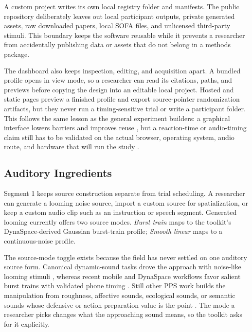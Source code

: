 \documentclass[pdflatex,sn-apa]{sn-jnl}
\begin{document}
A custom project writes its own local registry folder and manifests. The public repository deliberately leaves out local participant outputs, private generated assets, raw downloaded papers, local SOFA files, and unlicensed third-party stimuli. This boundary keeps the software reusable while it prevents a researcher from accidentally publishing data or assets that do not belong in a methods package.

The dashboard also keeps inspection, editing, and acquisition apart. A bundled profile opens in view mode, so a researcher can read its citations, paths, and previews before copying the design into an editable local project. Hosted and static pages preview a finished profile and export source-pointer randomization artifacts, but they never run a timing-sensitive trial or write a participant folder. This follows the same lesson as the general experiment builders: a graphical interface lowers barriers and improves reuse \citep{AnwylIrvine2018,Peirce2019}, but a reaction-time or audio-timing claim still has to be validated on the actual browser, operating system, audio route, and hardware that will run the study \citep{Bridges2020,Ellis2024}.

\subsection{Auditory Ingredients}

Segment 1 keeps source construction separate from trial scheduling. A researcher can generate a looming noise source, import a custom source for spatialization, or keep a custom audio clip such as an instruction or speech segment. Generated looming currently offers two source modes. \emph{Burst train} maps to the toolkit's DynaSpace-derived Gaussian burst-train profile; \emph{Smooth linear} maps to a continuous-noise profile.

The source-mode toggle exists because the field has never settled on one auditory source form. Canonical dynamic-sound tasks drove the approach with noise-like looming stimuli \citep{Canzoneri2012,Farne2002}, whereas recent mobile and DynaSpace workflows favor salient burst trains with validated phone timing \citep{Roussel2025}. Still other PPS work builds the manipulation from roughness, affective sounds, ecological sounds, or semantic sounds whose defensive or action-preparation value is the point \citep{Taffou2021,Bahadori2021}. The mode a researcher picks changes what the approaching sound means, so the toolkit asks for it explicitly.
\end{document}
